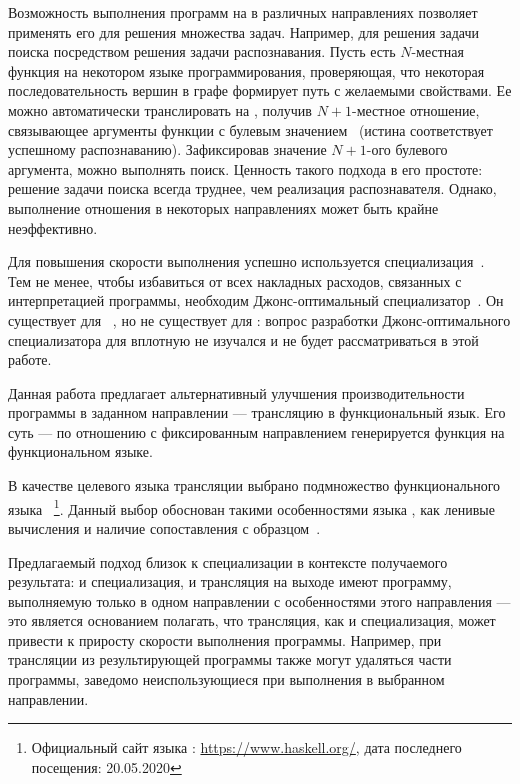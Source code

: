 Возможность выполнения программ на \miniKanren{} в различных направлениях позволяет применять его для решения множества задач.
Например, для решения задачи поиска посредством решения задачи распознавания.
Пусть есть $N$-местная функция на некотором языке программирования, проверяющая, что некоторая последовательность вершин в графе формирует путь с желаемыми свойствами.
Ее можно автоматически транслировать на \miniKanren{}, получив $N+1$-местное отношение, связывающее аргументы функции с булевым значением~\cite{lozov2019relational} (истина соответствует успешному распознаванию).
Зафиксировав значение $N+1$-ого булевого аргумента, можно выполнять поиск.
Ценность такого подхода в его простоте: решение задачи поиска всегда труднее, чем реализация распознавателя.
Однако, выполнение отношения в некоторых направлениях может быть крайне неэффективно.

Для повышения скорости выполнения успешно используется специализация~\cite{lozov2019relational}.
Тем не менее, чтобы избавиться от всех накладных расходов, связанных с интерпретацией программы, необходим Джонс-оптимальный специализатор~\cite{jones1993partial}.
Он существует для \prolog{}~\cite{leuschel2004prolog}, но не существует для \miniKanren{}: вопрос разработки Джонс-оптимального специализатора для \miniKanren{} вплотную не изучался и не будет рассматриваться в этой работе.

Данная работа предлагает альтернативный улучшения производительности программы в заданном направлении --- трансляцию в функциональный язык.
Его суть --- по отношению с фиксированным направлением генерируется функция на функциональном языке.

В качестве целевого языка трансляции выбрано подмножество функционального языка \haskell{}~\footnote{Официальный сайт языка \haskell{}: \url{https://www.haskell.org/}, дата последнего посещения: 20.05.2020}.
Данный выбор обоснован такими особенностями языка \haskell{}, как ленивые вычисления и наличие сопоставления с образцом~\cite{Jones2003HHH, Hudak2007history, Lipovaca2011LYAH}.

Предлагаемый подход близок к специализации в контексте получаемого результата: и специализация, и трансляция на выходе имеют программу, выполняемую только в одном направлении с особенностями этого направления --- это является основанием полагать, что трансляция, как и специализация, может привести к приросту скорости выполнения программы.
Например, при трансляции из результирующей программы также могут удаляться части программы, заведомо неиспользующиеся при выполнения в выбранном направлении.

